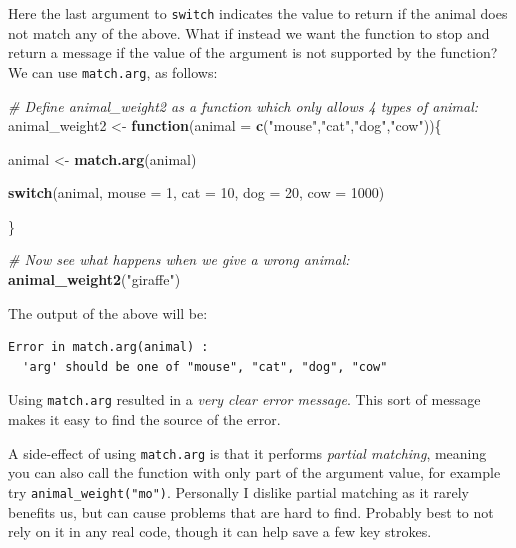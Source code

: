 \documentclass[]{book}
\newenvironment{Shaded}{\begin{snugshade}}{\end{snugshade}}
\newcommand{\CommentTok}[1]{\textcolor[rgb]{0.56,0.35,0.01}{\textit{#1}}}
\newcommand{\ControlFlowTok}[1]{\textcolor[rgb]{0.13,0.29,0.53}{\textbf{#1}}}
\newcommand{\DataTypeTok}[1]{\textcolor[rgb]{0.13,0.29,0.53}{#1}}
\newcommand{\DecValTok}[1]{\textcolor[rgb]{0.00,0.00,0.81}{#1}}
\newcommand{\KeywordTok}[1]{\textcolor[rgb]{0.13,0.29,0.53}{\textbf{#1}}}
\newcommand{\NormalTok}[1]{#1}
\newcommand{\StringTok}[1]{\textcolor[rgb]{0.31,0.60,0.02}{#1}}
\begin{document}
Here the last argument to \texttt{switch} indicates the value to return if the animal does not match any of the above. What if instead we want the function to stop and return a message if the value of the argument is not supported by the function? We can use \texttt{match.arg}, as follows:

\begin{Shaded}
\begin{Highlighting}[]
\CommentTok{# Define animal_weight2 as a function which only allows 4 types of animal:}
\NormalTok{animal_weight2 <-}\StringTok{ }\ControlFlowTok{function}\NormalTok{(}\DataTypeTok{animal =} \KeywordTok{c}\NormalTok{(}\StringTok{"mouse"}\NormalTok{,}\StringTok{"cat"}\NormalTok{,}\StringTok{"dog"}\NormalTok{,}\StringTok{"cow"}\NormalTok{))\{}
  
\NormalTok{  animal <-}\StringTok{ }\KeywordTok{match.arg}\NormalTok{(animal)}
  
  \ControlFlowTok{switch}\NormalTok{(animal, }
             \DataTypeTok{mouse =} \DecValTok{1}\NormalTok{,}
             \DataTypeTok{cat =} \DecValTok{10}\NormalTok{,}
             \DataTypeTok{dog =} \DecValTok{20}\NormalTok{,}
             \DataTypeTok{cow =} \DecValTok{1000}\NormalTok{)}
              
\NormalTok{\}}

\CommentTok{# Now see what happens when we give a wrong animal:}
\KeywordTok{animal_weight2}\NormalTok{(}\StringTok{"giraffe"}\NormalTok{)}
\end{Highlighting}
\end{Shaded}

The output of the above will be:

\begin{verbatim}
Error in match.arg(animal) : 
  'arg' should be one of "mouse", "cat", "dog", "cow"
\end{verbatim}

Using \texttt{match.arg} resulted in a \emph{very clear error message}. This sort of message makes it easy to find the source of the error.

A side-effect of using \texttt{match.arg} is that it performs \emph{partial matching}, meaning you can also call the function with only part of the argument value, for example try \texttt{animal\_weight("mo")}. Personally I dislike partial matching as it rarely benefits us, but can cause problems that are hard to find. Probably best to not rely on it in any real code, though it can help save a few key strokes.
\end{document}
